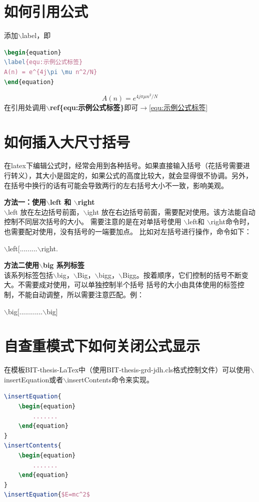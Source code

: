 \section{如何引用公式}
添加$\backslash$label{}，即
\begin{lstlisting}[language={tex}, caption={添加公式标签}]
\begin{equation}
\label{equ:示例公式标签}
A(n) = e^{4j\pi \mu n^2/N}
\end{equation}
\end{lstlisting}
\begin{equation}
\label{equ:示例公式标签}
A(n) = e^{4j\pi \mu n^2/N}
\end{equation}
在引用处调用\textbf{$\backslash$ref\{equ:示例公式标签\}}即可$\to$\ref{equ:示例公式标签}
\section{如何插入大尺寸括号}
\label{sec:如何插入大尺寸括号}
在latex下编辑公式时，经常会用到各种括号。如果直接输入括号（花括号需要进行转义），其大小是固定的，如果公式的高度比较大，就会显得很不协调。另外，在括号中换行的话有可能会导致两行的左右括号大小不一致，影响美观。

\textbf{方法一：使用$\backslash$left 和 $\backslash$right}\\
$\backslash$left 放在左边括号前面，$\backslash$ight 放在右边括号前面，需要配对使用。该方法能自动控制不同层次括号的大小。
需要注意的是在对单括号使用 $\backslash$left和 $\backslash$right命令时，也需要配对使用，没有括号的一端要加点。
比如对左括号进行操作，命令如下：

$\backslash$left[.........$\backslash$right.

\textbf{方法二使用$\backslash$big 系列标签}\\
该系列标签包括$\backslash$big，$\backslash$Big，$\backslash$bigg，$\backslash$Bigg。按着顺序，它们控制的括号不断变大。不需要成对使用，可以单独控制半个括号
括号的大小由具体使用的标签控制，不能自动调整，所以需要注意匹配。例： 

$\backslash$big[............$\backslash$big]

\noindent{}
\section{自查重模式下如何关闭公式显示}
在模板BIT-thesis-LaTex中（使用BIT-thesis-grd-jdh.cls格式控制文件）可以使用$\backslash$insertEquation或者$\backslash$insertContents命令来实现。
\begin{lstlisting}[language={tex}, caption={}]
\insertEquation{
	\begin{equation}
		.......
	\end{equation}
}
\insertContents{
	\begin{equation}
		.......
	\end{equation}
}
\insertEquation{$E=mc^2$
\end{lstlisting}